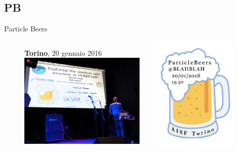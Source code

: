 \documentclass{Bredelebeamer}
\begin{document}
\subsection{PB}
\begin{frame}{Particle Beers}
\begin{figure}
\begin{columns}
\begin{column}{0.5\textwidth}
\vspace{1mm}
\centering 
\textbf{Torino}, 20 gennaio 2016 \\ \vspace{0.5cm}
\includegraphics[width=6cm]{images/PB2.jpg}
\end{column}
\begin{column}{0.5\textwidth}\centering
\includegraphics[width=4cm]{images/PB1.jpg}
\end{column}
\end{columns}
\end{figure}
\end{frame}
\end{document}
